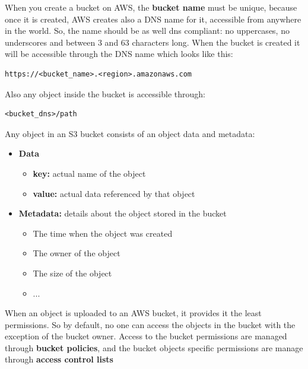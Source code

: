 \documentclass{article}
\newenvironment{codetemplate}[1][]{%
  \mybasecolorbox[#1]
  \itshape
}{%
  \endmybasecolorbox
}
\begin{document}
When you create a bucket on AWS, the \textbf{bucket name} must be unique, because once it is created, AWS creates also a DNS name for it, accessible from anywhere in the world. So, the name should be as well dns compliant: no uppercases, no underscores and between 3 and 63 characters long. When the bucket is created it will be accessible through the DNS name which looks like this:
\begin{codetemplate}{}
\begin{verbatim}
https://<bucket_name>.<region>.amazonaws.com
\end{verbatim}
\end{codetemplate}  

Also any object inside the bucket is accessible through:
\begin{codetemplate}{}
\begin{verbatim}
<bucket_dns>/path
\end{verbatim}
\end{codetemplate} 

Any object in an S3 bucket consists of an object data and metadata: 
\begin{itemize}
    \item \textbf{Data}
    \begin{itemize}
        \item \textbf{key:} actual name of the object
        \item \textbf{value:} actual data referenced by that object
    \end{itemize}

    \item \textbf{Metadata:} details about the object stored in the bucket
    \begin{itemize}
        \item The time when the object was created
        \item The owner of the object
        \item The size of the object
        \item ...
    \end{itemize}
\end{itemize}

When an object is uploaded to an AWS bucket, it provides it the least permissions. So by default, no one can access the objects in the bucket with the exception of the bucket owner. Access to the bucket permissions are managed through \textbf{bucket policies}, and the bucket objects specific permissions are manage through \textbf{access control lists}
\end{document}
